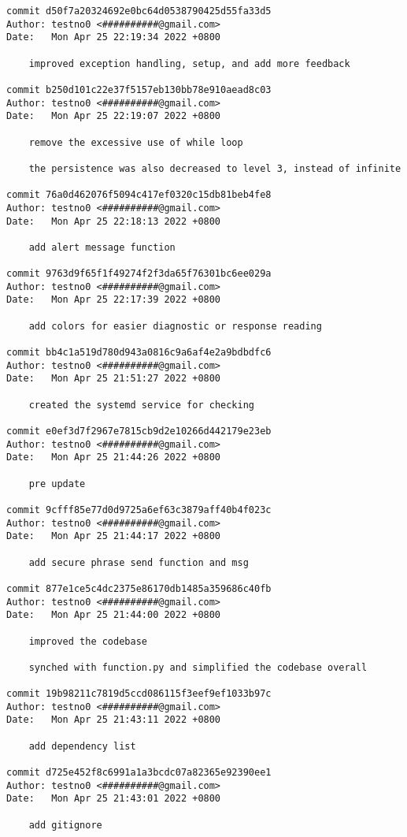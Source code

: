 \documentclass[12pt]{article}
\begin{document}
\begin{lstlisting}[caption={\texttt{git} log of the development.}]
commit d50f7a20324692e0bc64d0538790425d55fa33d5
Author: testno0 <##########@gmail.com>
Date:   Mon Apr 25 22:19:34 2022 +0800

	improved exception handling, setup, and add more feedback

commit b250d101c22e37f5157eb130bb78e910aead8c03
Author: testno0 <##########@gmail.com>
Date:   Mon Apr 25 22:19:07 2022 +0800

	remove the excessive use of while loop

	the persistence was also decreased to level 3, instead of infinite

commit 76a0d462076f5094c417ef0320c15db81beb4fe8
Author: testno0 <##########@gmail.com>
Date:   Mon Apr 25 22:18:13 2022 +0800

	add alert message function

commit 9763d9f65f1f49274f2f3da65f76301bc6ee029a
Author: testno0 <##########@gmail.com>
Date:   Mon Apr 25 22:17:39 2022 +0800

	add colors for easier diagnostic or response reading

commit bb4c1a519d780d943a0816c9a6af4e2a9bdbdfc6
Author: testno0 <##########@gmail.com>
Date:   Mon Apr 25 21:51:27 2022 +0800

	created the systemd service for checking

commit e0ef3d7f2967e7815cb9d2e10266d442179e23eb
Author: testno0 <##########@gmail.com>
Date:   Mon Apr 25 21:44:26 2022 +0800

	pre update

commit 9cfff85e77d0d9725a6ef63c3879aff40b4f023c
Author: testno0 <##########@gmail.com>
Date:   Mon Apr 25 21:44:17 2022 +0800

	add secure phrase send function and msg

commit 877e1ce5c4dc2375e86170db1485a359686c40fb
Author: testno0 <##########@gmail.com>
Date:   Mon Apr 25 21:44:00 2022 +0800

	improved the codebase

	synched with function.py and simplified the codebase overall

commit 19b98211c7819d5ccd086115f3eef9ef1033b97c
Author: testno0 <##########@gmail.com>
Date:   Mon Apr 25 21:43:11 2022 +0800

	add dependency list

commit d725e452f8c6991a1a3bcdc07a82365e92390ee1
Author: testno0 <##########@gmail.com>
Date:   Mon Apr 25 21:43:01 2022 +0800

	add gitignore


\end{lstlisting}
\end{document}
